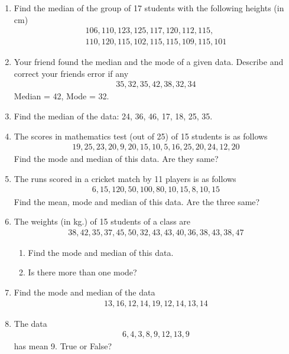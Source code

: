 \begin{enumerate}[label=\thesection.\arabic*, ref=\thesection.\theenumi,resume*]
	\item 
Find the median of
		the group of 17 students with the following heights (in cm)
\begin{gather*}
106, 110, 123, 125, 117, 120, 112, 115, 
\\
110, 120, 115, 102, 115, 115, 109, 115, 101
\end{gather*}
\item Your friend found the median and the mode of a given data. Describe and correct your friends error if any
\begin{gather*}
	35, 32, 35, 42, 38, 32, 34 
\end{gather*}
Median = 42, Mode = 32.
\item Find the median of the data: 24, 36, 46, 17, 18, 25, 35.
\item The scores in mathematics test (out of 25) of 15 students is as follows
	\begin{gather*}
	19, 25, 23, 20, 9, 20, 15, 10, 5, 16, 25, 20, 24, 12, 20 
\end{gather*}
Find the mode and median of this data. Are they same?
\item The runs scored in a cricket match by 11 players is as follows 
	\begin{gather*}
	6, 15, 120, 50, 100, 80, 10, 15, 8, 10, 15
\end{gather*}
Find the mean, mode and median of this data. Are the three same?
\item The weights (in kg.) of 15 students of a class are
	\begin{gather*}
	38, 42, 35, 37, 45, 50, 32, 43, 43, 40, 36, 38, 43, 38, 47
\end{gather*}
\begin{enumerate}
	\item  Find the mode and median of this data. 
	\item Is there more than one mode?
\end{enumerate}
\item Find the mode and median of the data
	\begin{gather*}
	13, 16, 12, 14, 19, 12, 14, 13, 14
\end{gather*}
\item
	The data 
	\begin{gather*}
	6, 4, 3, 8, 9, 12, 13, 9 
\end{gather*}
has mean 9.  True or False?
\end{enumerate}
